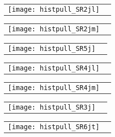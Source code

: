 \documentclass[landscape,12pt,a4paper]{article}
\begin{document}
\begin{figure}[H]\begin{center}\begin{tabular}{cc}\texttt{[image: histpull\_SR2jl]}\end{tabular}\end{center}\end{figure}
\begin{figure}[H]\begin{center}\begin{tabular}{cc}\texttt{[image: histpull\_SR2jm]}\end{tabular}\end{center}\end{figure}
\begin{figure}[H]\begin{center}\begin{tabular}{cc}\texttt{[image: histpull\_SR5j]}\end{tabular}\end{center}\end{figure}
\begin{figure}[H]\begin{center}\begin{tabular}{cc}\texttt{[image: histpull\_SR4jl]}\end{tabular}\end{center}\end{figure}
\begin{figure}[H]\begin{center}\begin{tabular}{cc}\texttt{[image: histpull\_SR4jm]}\end{tabular}\end{center}\end{figure}
\begin{figure}[H]\begin{center}\begin{tabular}{cc}\texttt{[image: histpull\_SR3j]}\end{tabular}\end{center}\end{figure}
\begin{figure}[H]\begin{center}\begin{tabular}{cc}\texttt{[image: histpull\_SR6jt]}\end{tabular}\end{center}\end{figure}
\end{document}
